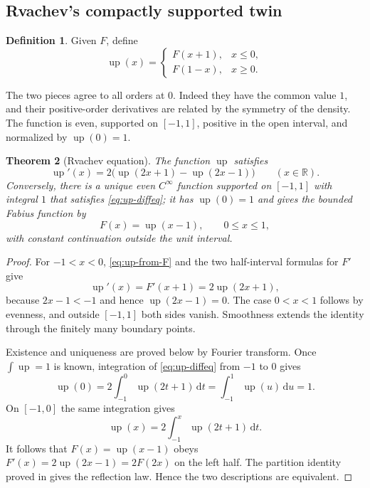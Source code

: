 \documentclass[11pt]{article}
\numberwithin{equation}{section}
\newtheorem{theorem}{Theorem}[section]
\theoremstyle{definition}
\newtheorem{definition}[theorem]{Definition}
\theoremstyle{remark}
\newcommand{\R}{\mathbb{R}}
\newcommand{\dd}{\,\mathrm{d}}
\newcommand{\upf}{\operatorname{up}}
\begin{document}
\subsection{Rvachev's compactly supported twin}

\begin{definition}\label{def:up-from-F}
Given $F$, define
\begin{equation}\label{eq:up-from-F}
 \upf(x)=
 \begin{cases}
  F(x+1),&x\le0,\\
  F(1-x),&x\ge0.
 \end{cases}
\end{equation}
\end{definition}

The two pieces agree to all orders at $0$.  Indeed they have the common value
$1$, and their positive-order derivatives are related by the symmetry of the
density.  The function is even, supported on $[-1,1]$, positive in the open
interval, and normalized by $\upf(0)=1$.

\begin{theorem}[Rvachev equation]\label{thm:rvachev-equation}
The function $\upf$ satisfies
\begin{equation}\label{eq:up-diffeq}
 \upf'(x)=2\bigl(\upf(2x+1)-\upf(2x-1)\bigr)
 \qquad(x\in\R).
\end{equation}
Conversely, there is a unique even $C^\infty$ function supported on $[-1,1]$
with integral $1$ that satisfies \eqref{eq:up-diffeq}; it has $\upf(0)=1$ and
gives the bounded Fabius function by
\begin{equation}\label{eq:F-from-up}
 F(x)=\upf(x-1),\qquad 0\le x\le1,
\end{equation}
with constant continuation outside the unit interval.
\end{theorem}

\begin{proof}
For $-1<x<0$, \eqref{eq:up-from-F} and the two half-interval formulas for
$F'$ give
\[
 \upf'(x)=F'(x+1)=2\upf(2x+1),
\]
because $2x-1<-1$ and hence $\upf(2x-1)=0$.  The case $0<x<1$ follows by
evenness, and outside $[-1,1]$ both sides vanish.  Smoothness extends the
identity through the finitely many boundary points.

Existence and uniqueness are proved below by Fourier transform.  Once
$\int\upf=1$ is known, integration of \eqref{eq:up-diffeq} from $-1$ to $0$
gives
\[
 \upf(0)=2\int_{-1}^{0}\upf(2t+1)\dd t
       =\int_{-1}^{1}\upf(u)\dd u=1.
\]
On $[-1,0]$ the same integration gives
\begin{equation}\label{eq:up-left-integral}
 \upf(x)=2\int_{-1}^{x}\upf(2t+1)\dd t.
\end{equation}
It follows that $F(x)=\upf(x-1)$ obeys $F'(x)=2\upf(2x-1)=2F(2x)$ on the
left half.  The partition identity proved in 
gives the reflection law.  Hence the two descriptions are equivalent.
\end{proof}
\end{document}
